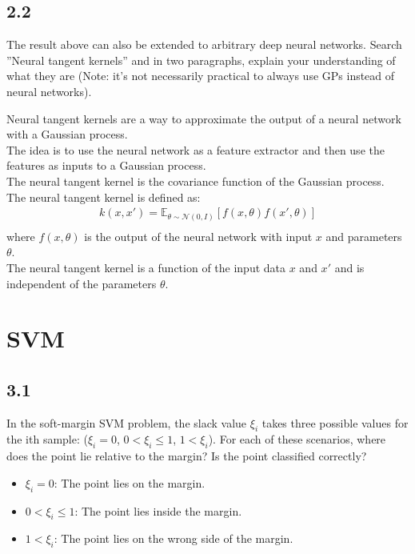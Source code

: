 \documentclass[12pt]{article}
\begin{document}
\subsection{2.2}
The result above can also be extended to arbitrary deep neural networks. Search ”Neural
tangent kernels” and in two paragraphs, explain your understanding of what they are (Note:
it’s not necessarily practical to always use GPs instead of neural networks).
\begin{qsolve}
    Neural tangent kernels are a way to approximate the output of a neural network with a Gaussian process. \\
    The idea is to use the neural network as a feature extractor and then use the features as inputs to a Gaussian process. \\
    The neural tangent kernel is the covariance function of the Gaussian process. \\
    The neural tangent kernel is defined as:
    \begin{gather*}
        k(x, x') = \mathbb{E}_{\theta \sim \mathcal{N}(0, I)}[f(x, \theta) f(x', \theta)] \\
    \end{gather*}
    where $f(x, \theta)$ is the output of the neural network with input $x$ and parameters $\theta$. \\
    The neural tangent kernel is a function of the input data $x$ and $x'$ and is independent of the parameters $\theta$. \\
\end{qsolve}

\section{SVM}
\subsection{3.1}
In the soft-margin SVM problem, the slack value $\xi_i$ takes three possible values for the ith
sample: ($\xi_i = 0$, $0 < \xi_i \leq 1$, $1 < \xi_i$). For each of these scenarios, where does the point lie relative
to the margin? Is the point classified correctly?
\begin{qsolve}
    \begin{itemize}
        \item $\xi_i = 0$: The point lies on the margin.
        \item $0 < \xi_i \leq 1$: The point lies inside the margin.
        \item $1 < \xi_i$: The point lies on the wrong side of the margin.
    \end{itemize}
\end{qsolve}
\end{document}
